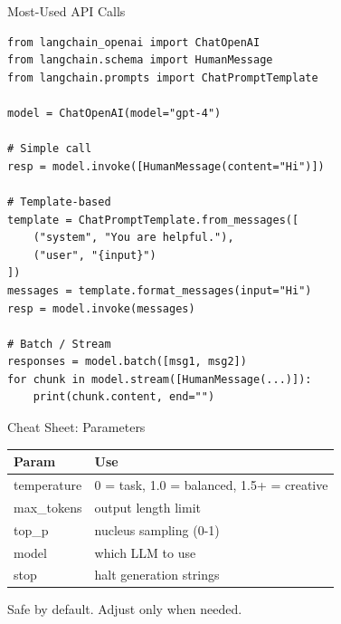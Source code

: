 \documentclass[aspectratio=169,11pt]{beamer}
\begin{document}
\begin{frame}[fragile]{Most-Used API Calls}
  \begin{codebox}
    \begin{lstlisting}[basicstyle=\ttfamily\tiny]
from langchain_openai import ChatOpenAI
from langchain.schema import HumanMessage
from langchain.prompts import ChatPromptTemplate

model = ChatOpenAI(model="gpt-4")

# Simple call
resp = model.invoke([HumanMessage(content="Hi")])

# Template-based
template = ChatPromptTemplate.from_messages([
    ("system", "You are helpful."),
    ("user", "{input}")
])
messages = template.format_messages(input="Hi")
resp = model.invoke(messages)

# Batch / Stream
responses = model.batch([msg1, msg2])
for chunk in model.stream([HumanMessage(...)]):
    print(chunk.content, end="")
    \end{lstlisting}
  \end{codebox}
\end{frame}

\begin{frame}{Cheat Sheet: Parameters}
  \begin{footnotesize}
    \renewcommand{\arraystretch}{1.05}
    \centering
    \begin{tabular}{lp{5cm}}
      \toprule
      \textbf{Param} & \textbf{Use} \\
      \midrule
      temperature & 0 = task, 1.0 = balanced, 1.5+ = creative \\
      max\_tokens & output length limit \\
      top\_p & nucleus sampling (0-1) \\
      model & which LLM to use \\
      stop & halt generation strings \\
      \bottomrule
    \end{tabular}
  \end{footnotesize}

  \vspace{0.1cm}
  \begin{tipbox}[Defaults]
    Safe by default. Adjust only when needed.
  \end{tipbox}
\end{frame}

\end{document}
